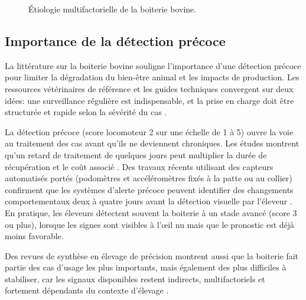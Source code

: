 \begin{figure}[H]
{%
    }
    \caption{Étiologie multifactorielle de la boiterie bovine.}
    \label{fig:etiologie}
\end{figure}

\subsection{Importance de la détection précoce}
La littérature sur la boiterie bovine souligne l'importance d'une détection précoce pour
limiter la dégradation du bien-être animal et les impacts de production. Les ressources
vétérinaires de référence et les guides techniques convergent sur deux idées:
une surveillance régulière est indispensable, et la prise en charge doit être
structurée et rapide selon la sévérité du cas
\citep{merck_lameness_overview,dairynz_treating_lameness}.

La détection précoce (score locomoteur 2 sur une échelle de 1 à 5) ouvre la voie au
traitement des cas avant qu'ils ne deviennent chroniques. Les études montrent qu'un
retard de traitement de quelques jours peut multiplier la durée de récupération et le
coût associé \citep{green2002financial}. Des travaux récents utilisant des capteurs
automatisés portés (podomètres et accéléromètres fixés à la patte ou au collier)
confirment que les systèmes d'alerte précoce peuvent identifier des changements
comportementaux deux à quatre jours avant la détection visuelle par l'éleveur
\citep{chapinal2010measurement,pastell2009measurement}. En pratique, les éleveurs
détectent souvent la boiterie à un stade avancé (score 3 ou plus), lorsque les signes
sont visibles à l'œil nu mais que le pronostic est déjà moins favorable.

Des revues de synthèse en élevage de précision montrent aussi que la boiterie fait partie
des cas d'usage les plus importants, mais également des plus difficiles à stabiliser, car
les signaux disponibles restent indirects, multifactoriels et fortement dépendants du
contexte d'élevage \citep{palma2025scoping,michelena2025plf_review}.

